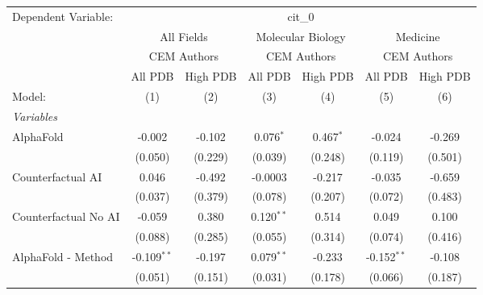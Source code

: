 \begingroup
\centering
\begin{tabular}{lcccccc}
   \tabularnewline \midrule \midrule
   Dependent Variable: & \multicolumn{6}{c}{cit\_0}\\
 & \multicolumn{2}{c}{All Fields} & \multicolumn{2}{c}{Molecular Biology} & \multicolumn{2}{c}{Medicine} \\
\cmidrule(lr){2-3} \cmidrule(lr){4-5} \cmidrule(lr){6-7}
 & \multicolumn{2}{c}{CEM Authors} & \multicolumn{2}{c}{CEM Authors} & \multicolumn{2}{c}{CEM Authors} \\
\cmidrule(lr){2-3} \cmidrule(lr){4-5} \cmidrule(lr){6-7}
 & \multicolumn{1}{c}{All PDB} & \multicolumn{1}{c}{High PDB} & \multicolumn{1}{c}{All PDB} & \multicolumn{1}{c}{High PDB} & \multicolumn{1}{c}{All PDB} & \multicolumn{1}{c}{High PDB} \\
\cmidrule(lr){2-2} \cmidrule(lr){3-3} \cmidrule(lr){4-4} \cmidrule(lr){5-5} \cmidrule(lr){6-6} \cmidrule(lr){7-7}
   Model:                                                     & (1)           & (2)     & (3)           & (4)         & (5)           & (6)\\  
   \midrule
   \emph{Variables}\\
   AlphaFold                                                  & -0.002        & -0.102  & 0.076$^{*}$   & 0.467$^{*}$ & -0.024        & -0.269\\   
                                                              & (0.050)       & (0.229) & (0.039)       & (0.248)     & (0.119)       & (0.501)\\   
   Counterfactual AI                                          & 0.046         & -0.492  & -0.0003       & -0.217      & -0.035        & -0.659\\   
                                                              & (0.037)       & (0.379) & (0.078)       & (0.207)     & (0.072)       & (0.483)\\   
   Counterfactual No AI                                       & -0.059        & 0.380   & 0.120$^{**}$  & 0.514       & 0.049         & 0.100\\   
                                                              & (0.088)       & (0.285) & (0.055)       & (0.314)     & (0.074)       & (0.416)\\   
   AlphaFold - Method                                         & -0.109$^{**}$ & -0.197  & 0.079$^{**}$  & -0.233      & -0.152$^{**}$ & -0.108\\   
                                                              & (0.051)       & (0.151) & (0.031)       & (0.178)     & (0.066)       & (0.187)\\   

\end{tabular}
